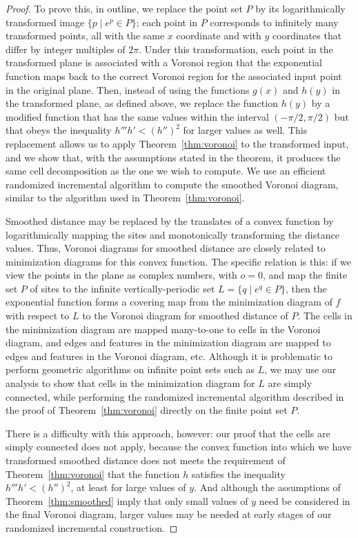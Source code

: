 \documentclass[10pt, conference, compsocconf]{IEEEtran}
\begin{document}
\begin{proof}
To prove this, in outline, we replace the point set $P$ by its logarithmically transformed image $\{p\mid e^p\in P\}$; each point in $P$ corresponds to infinitely many transformed points, all with the same $x$ coordinate and with $y$ coordinates that differ by integer multiples of $2\pi$. Under this transformation, each point in the transformed plane is associated with a Voronoi region that the exponential function maps back to the correct Voronoi region for the associated input point in the original plane. Then, instead of using the functions $g(x)$ and $h(y)$ in the transformed plane, as defined above, we replace the function $h(y)$ by a modified function that has the same values within the interval $(-\pi/2,\pi/2)$ but that obeys the inequality $h'''h'<(h'')^2$ for larger values as well. This replacement allows us to apply Theorem~\ref{thm:voronoi} to the transformed input, and
we show that, with the assumptions stated in the theorem, it produces the same cell decomposition as the one we wish to compute. We use an efficient randomized incremental algorithm to compute the smoothed Voronoi diagram, similar to the algorithm used in Theorem~\ref{thm:voronoi}. 

Smoothed distance may be replaced by the translates of a convex function by logarithmically mapping the sites and monotonically transforming the distance values.
Thus, Voronoi diagrams for smoothed distance are closely related to minimization diagrams for this convex function. The specific relation is this: if we view the points in the plane as complex numbers,
with $o=0$, and map the finite set $P$ of sites to the infinite vertically-periodic set $L=\{q\mid e^q\in P\}$, then the exponential function forms a covering map from the minimization diagram of $f$ with respect to $L$ to the Voronoi diagram for smoothed distance of $P$. The cells in the minimization diagram are mapped many-to-one to cells in the Voronoi diagram, and edges and features in the minimization diagram are mapped to edges and features in the Voronoi diagram, etc. Although it is problematic to perform geometric algorithms on infinite point sets such as $L$, we may use our analysis to show that cells in the minimization diagram for $L$ are simply connected, while performing the randomized incremental algorithm described in the proof of Theorem~\ref{thm:voronoi} directly on the finite point set $P$.

There is a difficulty with this approach, however: our proof that the cells are simply connected does not apply, because the convex function into which we have transformed smoothed distance does not meets the requirement of Theorem~\ref{thm:voronoi} that the function $h$ satisfies the inequality $h'''h'<(h'')^2$, at least for large values of $y$. And although the assumptions of Theorem~\ref{thm:smoothed} imply that only small values of $y$ need be considered in the final Voronoi diagram, larger values may be needed at early stages of our randomized incremental construction.


\end{proof}
\end{document}
